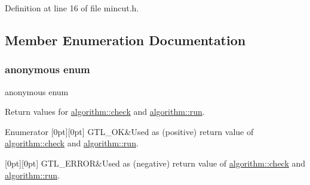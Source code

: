 Definition at line 16 of file mincut.\+h.



\subsection{Member Enumeration Documentation}
\mbox{\label{classalgorithm_af1a0078e153aa99c24f9bdf0d97f6710}} 
\subsubsection{\texorpdfstring{anonymous enum}{anonymous enum}}
{\footnotesize\ttfamily anonymous enum\hspace{0.3cm}{\ttfamily [inherited]}}



Return values for \mbox{\hyperlink{classalgorithm_a76361fb03ad1cf643affc51821e43bed}{algorithm\+::check}} and \mbox{\hyperlink{classalgorithm_a734b189509a8d6b56b65f8ff772d43ca}{algorithm\+::run}}. 

\begin{DoxyEnumFields}{Enumerator}
[0pt][0pt]{}\mbox{\label{classalgorithm_af1a0078e153aa99c24f9bdf0d97f6710a5114c20e4a96a76b5de9f28bf15e282b}} 
G\+T\+L\+\_\+\+OK&Used as (positive) return value of \mbox{\hyperlink{classalgorithm_a76361fb03ad1cf643affc51821e43bed}{algorithm\+::check}} and \mbox{\hyperlink{classalgorithm_a734b189509a8d6b56b65f8ff772d43ca}{algorithm\+::run}}. \\
\hline

[0pt][0pt]{}\mbox{\label{classalgorithm_af1a0078e153aa99c24f9bdf0d97f6710a6fcf574690bbd6cf710837a169510dd7}} 
G\+T\+L\+\_\+\+E\+R\+R\+OR&Used as (negative) return value of \mbox{\hyperlink{classalgorithm_a76361fb03ad1cf643affc51821e43bed}{algorithm\+::check}} and \mbox{\hyperlink{classalgorithm_a734b189509a8d6b56b65f8ff772d43ca}{algorithm\+::run}}. \\
\hline

\end{DoxyEnumFields}


